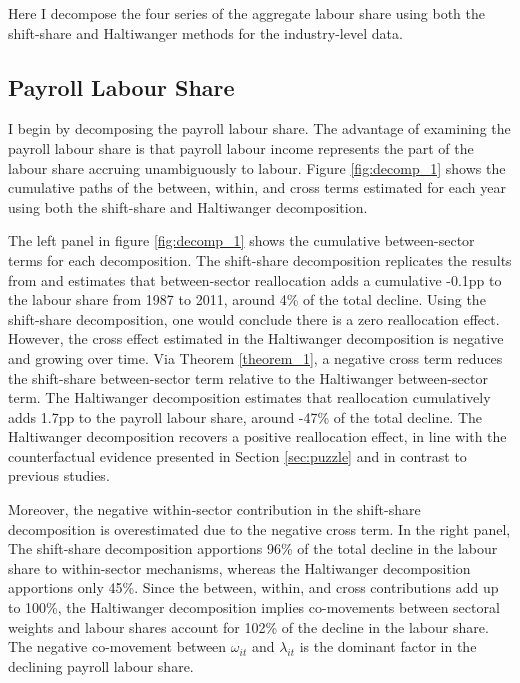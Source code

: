 Here I decompose the four series of the aggregate labour share using both the shift-share and Haltiwanger methods for the industry-level data. 



\subsection{Payroll Labour Share}
I begin by decomposing the payroll labour share. The advantage of examining the payroll labour share is that payroll labour income represents the part of the labour share accruing unambiguously to labour. Figure \ref{fig:decomp_1} shows the cumulative paths of the between, within, and cross terms estimated for each year using both the shift-share and Haltiwanger decomposition. 

The left panel in figure \ref{fig:decomp_1} shows the cumulative between-sector terms for each decomposition. The shift-share decomposition replicates the results from \citet{elsbyDeclineLaborShare2013a} and estimates that between-sector reallocation adds a cumulative -0.1pp to the labour share from 1987 to 2011, around 4\% of the total decline. Using the shift-share decomposition, one would conclude there is a zero reallocation effect. However, the cross effect estimated in the Haltiwanger decomposition is negative and growing over time. Via Theorem \ref{theorem_1}, a negative cross term reduces the shift-share between-sector term relative to the Haltiwanger between-sector term. The Haltiwanger decomposition estimates that reallocation cumulatively adds 1.7pp to the payroll labour share, around -47\% of the total decline. The Haltiwanger decomposition recovers a positive reallocation effect, in line with the counterfactual evidence presented in Section \ref{sec:puzzle} and in contrast to previous studies. 

Moreover, the negative within-sector contribution in the shift-share decomposition is overestimated due to the negative cross term. In the right panel, The shift-share decomposition apportions 96\% of the total decline in the labour share to within-sector mechanisms, whereas the Haltiwanger decomposition apportions only 45\%. Since the between, within, and cross contributions add up to 100\%, the Haltiwanger decomposition implies co-movements between sectoral weights and labour shares account for 102\% of the decline in the labour share. The negative co-movement between $\omega_{it}$ and $\lambda_{it}$ is the dominant factor in the declining payroll labour share. 

